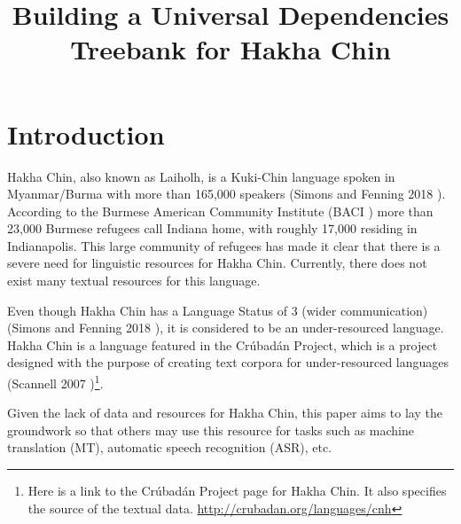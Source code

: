 \documentclass[10pt, a4paper]{article}
\title{Building a Universal Dependencies Treebank for Hakha Chin\\ \vspace*{.5\baselineskip}} %
\begin{document}
\maketitleabstract

\section{Introduction}
\label{sec:intro}

Hakha Chin, also known as Laiholh, is a Kuki-Chin language spoken in Myanmar/Burma with more than 165,000 speakers (Simons and Fenning 2018 \cite{simon2018ethnologue}). According to the Burmese American Community Institute (BACI \cite{baci}) more than 23,000 Burmese refugees call Indiana home, with roughly 17,000 residing in Indianapolis. This large community of refugees has made it clear that there is a severe need for linguistic resources for Hakha Chin. Currently, there does not exist many textual resources for this language. %

Even though Hakha Chin has a Language Status of 3 (wider communication) (Simons and Fenning 2018 \cite{simon2018ethnologue}), it is considered to be an under-resourced language. Hakha Chin is a language featured in the Cr\'ubad\'an Project, which is a project designed with the purpose of creating text corpora for under-resourced languages (Scannell 2007 \cite{scannell2007crubadan})\footnote{Here is a link to the Cr\'ubad\'an Project page for Hakha Chin. It also specifies the source of the textual data. \url{http://crubadan.org/languages/cnh}}. 

Given the lack of data and resources for Hakha Chin, this paper aims to lay the groundwork so that others may use this resource for tasks such as machine translation (MT), automatic speech recognition (ASR), etc.

\end{document}
